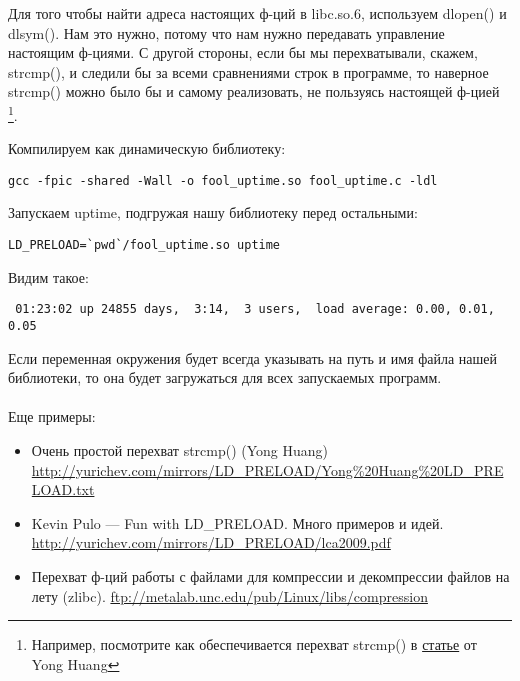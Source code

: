 Для того чтобы найти адреса настоящих ф-ций в libc.so.6, используем dlopen() и dlsym(). Нам это нужно, потому что нам
нужно передавать управление настоящим ф-циями. 
С другой стороны, если бы мы перехватывали, скажем, strcmp(),
и следили бы за всеми сравнениями строк в программе, то наверное strcmp() можно было бы и самому реализовать, не
пользуясь настоящей ф-цией
\footnote{Например, посмотрите как обеспечивается перехват strcmp() в \href{http://yurichev.com/mirrors/LD\_PRELOAD/Yong\%20Huang\%20LD\_PRELOAD.txt}{статье} от Yong Huang}.



Компилируем как динамическую библиотеку:

\begin{lstlisting}
gcc -fpic -shared -Wall -o fool_uptime.so fool_uptime.c -ldl
\end{lstlisting}

Запускаем uptime, подгружая нашу библиотеку перед остальными:

\begin{lstlisting}
LD_PRELOAD=`pwd`/fool_uptime.so uptime
\end{lstlisting}

Видим такое:

\begin{lstlisting}
 01:23:02 up 24855 days,  3:14,  3 users,  load average: 0.00, 0.01, 0.05
\end{lstlisting}

Если переменная окружения  будет всегда указывать на путь и имя файла нашей библиотеки, то она будет
загружаться для всех запускаемых программ. \\
\\
Еще примеры:

\begin{itemize}

\item
Очень простой перехват strcmp() (Yong Huang) \url{http://yurichev.com/mirrors/LD\_PRELOAD/Yong\%20Huang\%20LD\_PRELOAD.txt}

\item
Kevin Pulo --- Fun with LD\_PRELOAD. Много примеров и идей. \url{http://yurichev.com/mirrors/LD_PRELOAD/lca2009.pdf}

\item
Перехват ф-ций работы с файлами для компрессии и декомпрессии файлов на лету (zlibc). \url{ftp://metalab.unc.edu/pub/Linux/libs/compression}

\end{itemize}
